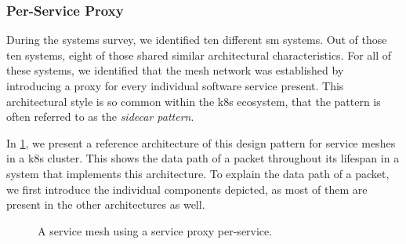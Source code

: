 \subsubsection{Per-Service Proxy}
\label{sec:survey:analysis:architectures:per-service}

During the systems survey, we identified ten different \gls{sm} systems. Out of those ten systems, eight of those shared similar architectural characteristics. For all of these systems, we identified that the mesh network was established by introducing a proxy for every individual software service present. This architectural style is so common within the \gls{k8s} ecosystem, that the pattern is often referred to as the \textit{sidecar pattern}.


In \cref{fig:sm-arch-per-service}, we present a reference architecture of this design pattern for service meshes in a \gls{k8s} cluster. This shows the data path of a packet throughout its lifespan in a system that implements this architecture. To explain the data path of a packet, we first introduce the individual components depicted, as most of them are present in the other architectures as well. 

\begin{figure}[!t]
    \centering
    

    \caption{A service mesh using a service proxy per-service.}
    \label{fig:sm-arch-per-service}
\end{figure}

